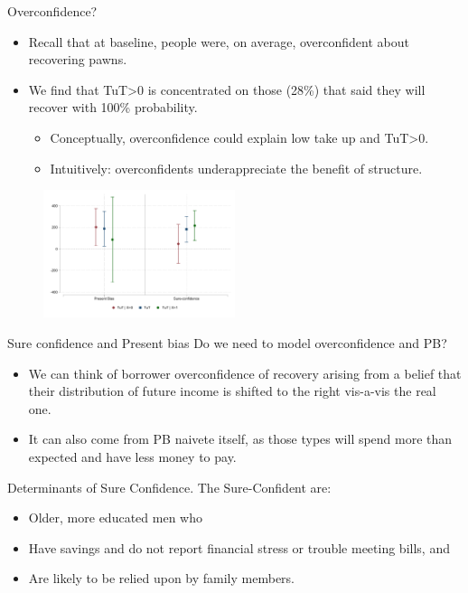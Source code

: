 \documentclass[9pt, aspectratio=169]{beamer}
\begin{document}
\begin{frame}{Overconfidence?}

\begin{itemize}
    \item   Recall that at baseline, people were, on average, overconfident about recovering pawns.
    \vfill \item We find that TuT>0 is concentrated on those (28\%) that said they will recover with 100\% probability. 
    \begin{itemize}
        \item Conceptually, overconfidence could explain low take up and TuT>0.
        \item Intuitively: overconfidents underappreciate the benefit of structure.
    \end{itemize}
\end{itemize}
\begin{figure}[H]
        \includegraphics[width=0.5\textwidth]{Figuras/tut_beh_partition.pdf}
\end{figure}
\end{frame}



\begin{frame}{Sure confidence and Present bias}
Do we need to model overconfidence and PB?
\begin{itemize}
    \item We can think of borrower overconfidence of recovery arising from a belief that their distribution of future income is shifted to the right vis-a-vis the real one.
    \item It can also come from PB naivete itself, as those types will spend more than expected and have less money to pay.
\end{itemize}
\vfill Determinants of Sure Confidence. The Sure-Confident are:
\begin{itemize}
    \item   Older, more educated men who
    \item   Have savings and do not report financial stress or trouble meeting bills, and 
    \item   Are likely to be relied upon by family members.
\end{itemize}   

\end{frame}
\end{document}
